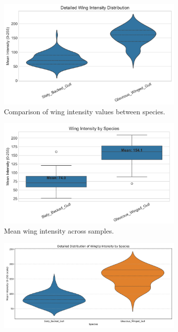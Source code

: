 \documentclass[a4paper,12pt]{report}
\begin{document}
\begin{figure}[H]
    \centering
    \begin{subfigure}[b]{0.48\textwidth}
        \centering
        \includegraphics[width=\textwidth]{images/REPORT_IMAGES_INTENSITY/I2/wing_intensity_analysis.png}
        \caption{Comparison of wing intensity values between species.}
        \label{fig:wing_intensity}
    \end{subfigure}
    \hfill
    \begin{subfigure}[b]{0.48\textwidth}
        \centering
        \includegraphics[width=\textwidth]{images/REPORT_IMAGES_INTENSITY/I2/WINGINTENSITY.png}
        \caption{Mean wing intensity across samples.}
        \label{fig:wing_intensity_means}
    \end{subfigure}
    \par\vspace{1.5ex}
    \begin{subfigure}[b]{0.48\textwidth}
        \centering
        \includegraphics[width=\textwidth]{images/REPORT_IMAGES_INTENSITY/I2/wingtip_intensity_violin_plot.png}

\end{subfigure}
\end{figure}
\end{document}
